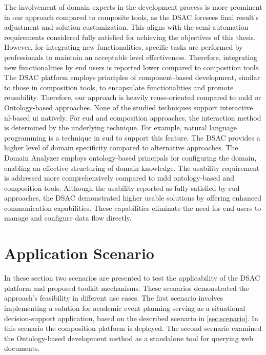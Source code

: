 The involvement of domain experts in the development process is more prominent in our approach compared to composite tools, as the DSAC foresees final result's adjustment and solution customization. This aligns with the semi-automation requirements considered fully satisfied for achieving the objectives of this thesis. However, for integrating new functionalities, specific tasks are performed by professionals to maintain an acceptable level effectiveness. Therefore, integrating new functionalities by end users is reported lower compared to composition tools. 
The DSAC platform employs principles of component-based development, similar to those in composition tools, to encapsulate functionalities and promote reusability. Therefore, our approach is heavily reuse-oriented compared to \gls{mdd} or Ontology-based approaches. 
None of the studied techniques support interactive \gls{nl}-based \gls{ui} natively. For \gls{eud} and composition approaches, the interaction method is determined by the underlying technique. For example, natural language programming is a technique in \gls{eud} to support this feature. 
The DSAC provides a higher level of domain specificity compared to alternative approaches. The Domain Analyzer employs ontology-based principals for configuring the domain, enabling an effective structuring of domain knowledge. The usability requirement is addressed more comprehensively compared to \gls{mdd} ontology-based and composition tools. Although the usability reported as fully satisfied by \gls{eud} approaches, the DSAC demonstrated higher usable solutions by offering  enhanced communication capabilities. These capabilities eliminate the need for end users to manage and configure data flow directly.


\vspace{-15pt}
\hypertarget{sec:evaluation.app-scenario}{%
\section{Application Scenario}\label{sec:evaluation.app-scenario}}
\vspace{15pt}
In these section two scenarios are presented to test the applicability of the DSAC platform and proposed toolkit mechanisms. These scenarios demonstrated the approach's feasibility in different use cases. The first scenario involves implementing a solution for academic event planning serving as a situational decision-support application, based on the described scenario in \cref{sec:scenario}. In this scenario the composition platform is deployed. The second scenario examined the Ontology-based development method as a standalone tool for querying web documents.

